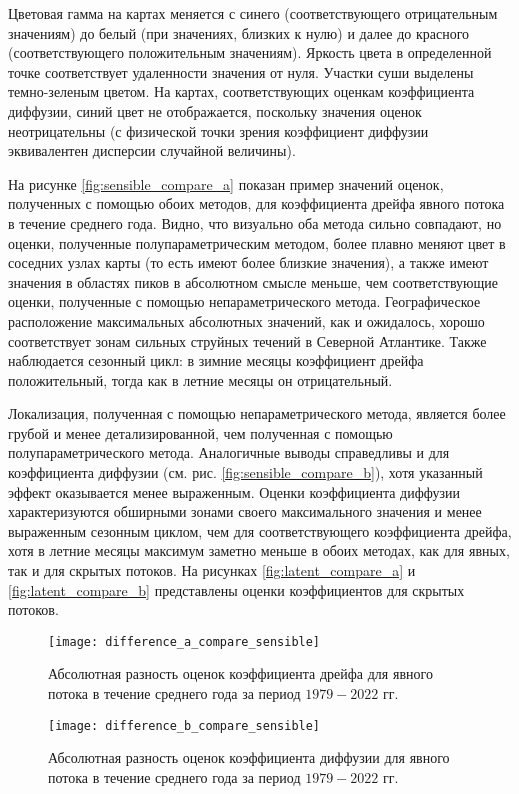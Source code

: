 Цветовая гамма на картах меняется с синего (соответствующего отрицательным значениям) до белый (при значениях, близких к нулю) и далее до красного (соответствующего положительным значениям). Яркость цвета в определенной точке соответствует удаленности значения от нуля. Участки суши выделены темно-зеленым цветом. На картах, соответствующих оценкам коэффициента диффузии, синий цвет не отображается, поскольку значения оценок неотрицательны (с физической точки зрения коэффициент диффузии эквивалентен дисперсии случайной величины).

На рисунке \ref{fig:sensible_compare_a} показан пример значений оценок, полученных с помощью обоих методов, для коэффициента дрейфа явного потока в течение среднего года. Видно, что визуально оба метода сильно совпадают, но оценки, полученные полупараметрическим методом, более плавно меняют цвет в соседних узлах карты (то есть имеют более близкие значения), а также имеют значения в областях пиков в абсолютном смысле меньше, чем соответствующие оценки, полученные с помощью непараметрического метода. Географическое расположение максимальных абсолютных значений, как и ожидалось, хорошо соответствует зонам сильных струйных течений в Северной Атлантике. Также наблюдается сезонный цикл: в зимние месяцы коэффициент дрейфа положительный, тогда как в летние месяцы он отрицательный.

Локализация, полученная с помощью непараметрического метода, является более грубой и менее детализированной, чем полученная с помощью полупараметрического метода. Аналогичные выводы справедливы и для коэффициента диффузии (см. рис. \ref{fig:sensible_compare_b}), хотя указанный эффект оказывается менее выраженным. Оценки коэффициента диффузии характеризуются обширными зонами своего максимального значения и менее выраженным сезонным циклом, чем для соответствующего коэффициента дрейфа, хотя в летние месяцы максимум заметно меньше в обоих методах, как для явных, так и для скрытых потоков. На рисунках \ref{fig:latent_compare_a} и \ref{fig:latent_compare_b} представлены оценки коэффициентов для скрытых потоков.

\begin{figure}[!h]
	\centering
	\texttt{[image: difference\_a\_compare\_sensible]}
	\caption{Абсолютная разность оценок коэффициента дрейфа для явного потока в течение среднего года за период $1979-2022$ гг.} 
	\label{fig:sensible_difference_a}
\end{figure}


\begin{figure}[!h]
	\centering
	\texttt{[image: difference\_b\_compare\_sensible]}
	\caption{Абсолютная разность оценок коэффициента диффузии для явного потока в течение среднего года за период $1979-2022$ гг.} 
	\label{fig:sensible_difference_b}
\end{figure}

